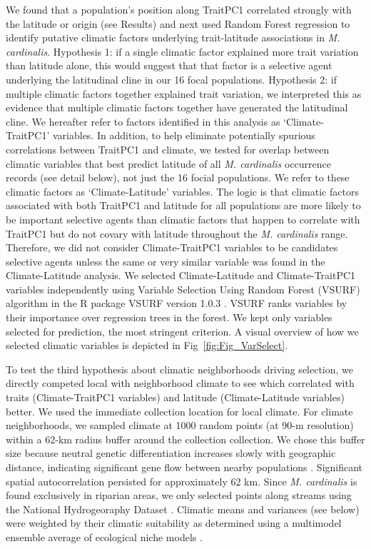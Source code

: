 \documentclass[11pt, oneside]{article}
\newcommand{\pkg}[1]{{\fontseries{b}\selectfont #1}}
\begin{document}
We found that a population's position along TraitPC1 correlated strongly with the latitude or origin (see Results) and next used Random Forest regression \citep{Liaw_Wiener_2002} to identify putative climatic factors underlying trait-latitude associations in \textit{M. cardinalis}. Hypothesis 1: if a single climatic factor explained more trait variation than latitude alone, this would suggest that that factor is a selective agent underlying the latitudinal cline in our 16 focal populations. Hypothesis 2: if multiple climatic factors together explained trait variation,  we interpreted this as evidence that multiple climatic factors together have generated the latitudinal cline. We hereafter refer to factors identified in this analysis as `Climate-TraitPC1' variables. In addition, to help eliminate potentially spurious correlations between TraitPC1 and climate, we tested for overlap between climatic variables that best predict latitude of all \textit{M. cardinalis} occurrence records (see detail below), not just the 16 focial populations. We refer to these climatic factors as `Climate-Latitude' variables. The logic is that climatic factors associated with both TraitPC1 and latitude for all populations are more likely to be important selective agents than climatic factors that happen to correlate with TraitPC1 but do not covary with latitude throughout the \textit{M. cardinalis} range. Therefore, we did not consider Climate-TraitPC1 variables to be candidates selective agents unless the same or very similar variable was found in the Climate-Latitude analysis. We selected Climate-Latitude and Climate-TraitPC1 variables independently using Variable Selection Using Random Forest (VSURF) algorithm in the R package \pkg{VSURF} version 1.0.3 \citep{Genuer_etal_2016}. VSURF ranks variables by their importance over regression trees in the forest. We kept only variables selected for prediction, the most stringent criterion. A visual overview of how we selected climatic variables is depicted in Fig~\ref{fig:Fig_VarSelect}.

To test the third hypothesis about climatic neighborhoods driving selection, we directly competed local with neighborhood climate to see which correlated with traits (Climate-TraitPC1 variables) and latitude (Climate-Latitude variables) better. We used the immediate collection location for local climate. For climate neighborhoods, we sampled climate at 1000 random points (at 90-m resolution) within a 62-km radius buffer around the collection collection. We chose this buffer size because neutral genetic differentiation increases slowly with geographic distance, indicating significant gene flow between nearby populations \citep{Paul_etal_2016}. Significant spatial autocorrelation persisted for approximately 62 km. Since \textit{M. cardinalis} is found exclusively in riparian areas, we only selected points along streams using the National Hydrogeoraphy Dataset \citep{NHD}. Climatic means and variances (see below) were weighted by their climatic suitability as determined using a multimodel ensemble average of ecological niche models \citep{Angert_ENM}.
\end{document}
